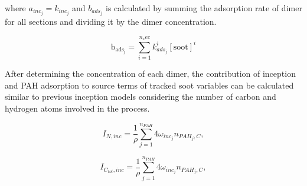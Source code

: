 where ${a_{inc_j} = k_{inc_{j}}}$ and ${b_{ads_j}}$ is calculated by summing the adsorption rate of dimer for all sections and dividing it by the dimer concentration.

\begin{equation}
	\mathrm{b_{ads_j}} = \sum_{i=1}^{n_sec} k^i_{ads_{j}} [\mathrm{soot}]^i
\end{equation}


After determining the concentration of each dimer, the contribution of inception and PAH adsorption to source terms of tracked soot variables can be calculated similar to previous inception models considering the number of carbon and hydrogen atoms involved in the process.

\begin{equation}
	I_{N,{inc}} = \frac{1}{\rho}
	\sum_{j=1}^{n_{PAH}}
	4\omega_{inc_{j}} 
	n_{PAH_j,C}
	\label{eqn:IN_inc_dimcoal},
\end{equation}

\begin{equation}
	I_{C_{tot},{inc}} = \frac{1}{\rho}
	\sum_{j=1}^{n_{PAH}}
	4\omega_{inc_{j}} 
	n_{PAH_j,C}
	\label{eqn:ICtot_inc_dimcoal},
\end{equation}

